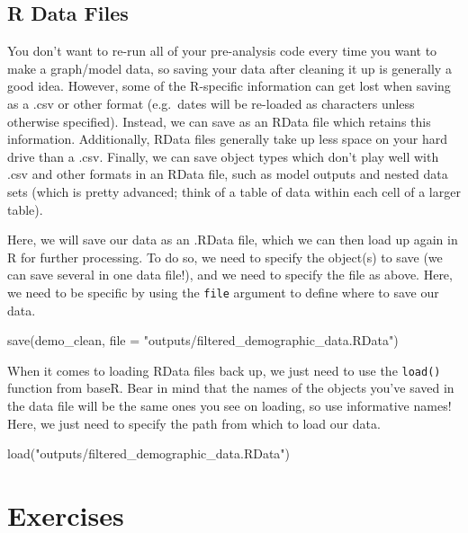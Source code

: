 \documentclass[
]{book}
\newenvironment{Shaded}{\begin{snugshade}}{\end{snugshade}}
\newcommand{\AttributeTok}[1]{\textcolor[rgb]{0.77,0.63,0.00}{#1}}
\newcommand{\FunctionTok}[1]{\textcolor[rgb]{0.00,0.00,0.00}{#1}}
\newcommand{\NormalTok}[1]{#1}
\newcommand{\StringTok}[1]{\textcolor[rgb]{0.31,0.60,0.02}{#1}}
\begin{document}
\hypertarget{r-data-files}{%
\subsection{R Data Files}\label{r-data-files}}

You don't want to re-run all of your pre-analysis code every time you want to make a graph/model data, so saving your data after cleaning it up is generally a good idea. However, some of the R-specific information can get lost when saving as a .csv or other format (e.g.~dates will be re-loaded as characters unless otherwise specified). Instead, we can save as an RData file which retains this information. Additionally, RData files generally take up less space on your hard drive than a .csv. Finally, we can save object types which don't play well with .csv and other formats in an RData file, such as model outputs and nested data sets (which is pretty advanced; think of a table of data within each cell of a larger table).

Here, we will save our data as an .RData file, which we can then load up again in R for further processing. To do so, we need to specify the object(s) to save (we can save several in one data file!), and we need to specify the file as above. Here, we need to be specific by using the \texttt{file} argument to define where to save our data.

\begin{Shaded}
\begin{Highlighting}[]
\FunctionTok{save}\NormalTok{(demo\_clean, }\AttributeTok{file =} \StringTok{"outputs/filtered\_demographic\_data.RData"}\NormalTok{)}
\end{Highlighting}
\end{Shaded}

When it comes to loading RData files back up, we just need to use the \texttt{load()} function from baseR. Bear in mind that the names of the objects you've saved in the data file will be the same ones you see on loading, so use informative names! Here, we just need to specify the path from which to load our data.

\begin{Shaded}
\begin{Highlighting}[]
\FunctionTok{load}\NormalTok{(}\StringTok{"outputs/filtered\_demographic\_data.RData"}\NormalTok{)}
\end{Highlighting}
\end{Shaded}

\hypertarget{exercises-4}{%
\section{Exercises}\label{exercises-4}}
\end{document}
